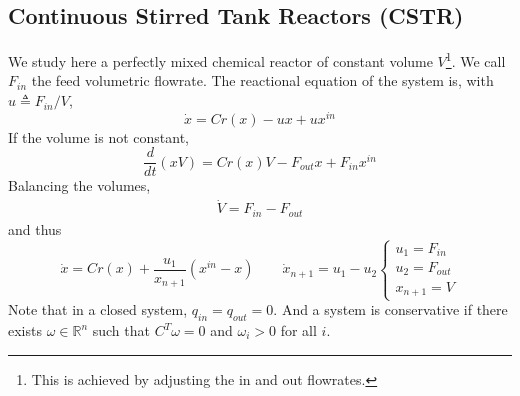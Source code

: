\documentclass[12pt, openany]{report}
\theoremstyle{definition}
\newcommand{\R}{\mathbb{R}}
\begin{document}
\subsection{Continuous Stirred Tank Reactors (CSTR)}
We study here a perfectly mixed chemical reactor of constant volume $V$\footnote{This is achieved by adjusting the in and out flowrates.}. We call $F_{in}$ the feed volumetric flowrate. The reactional equation of the system is, with $u\triangleq F_{in}/V$,
\begin{equation}
    \dot x = Cr(x)-ux+ux^{in}
\end{equation}
If the volume is not constant,
\begin{equation}
    \frac{d}{dt}(xV) = Cr(x)V-F_{out}x+F_{in}x^{in} 
\end{equation}
Balancing the volumes,
\begin{eqnarray}
    \dot V = F_{in}-F_{out}
\end{eqnarray}
and thus 
\begin{equation}
    \dot x = Cr(x) + \frac{u_1}{x_{n+1}}(x^{in}-x)\qquad \dot x_{n+1} = u_1-u_2 \begin{cases}
        u_1 = F_{in}\\
        u_2 = F_{out}\\
        x_{n+1} = V
    \end{cases}
\end{equation}
Note that in a closed system, $q_{in}=q_{out}=0$. And a system is conservative if there exists $\omega\in \R^n$ such that $C^T\omega=0$ and $\omega_i>0$ for all $i$.
\end{document}
